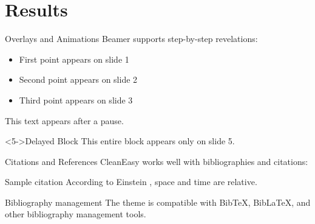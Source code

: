 \section{Results}
\begin{frame}{Overlays and Animations}
  Beamer supports step-by-step revelations:
  
  \begin{itemize}
    \item<1-> First point appears on slide 1
    \item<2-> Second point appears on slide 2
    \item<3-> Third point appears on slide 3
  \end{itemize}
  \pause
  This text appears after a pause.
  
  \begin{block}<5->{Delayed Block}
    This entire block appears only on slide 5.
  \end{block}
\end{frame}

\begin{frame}{Citations and References}
  CleanEasy works well with bibliographies and citations:
  
  \begin{block}{Sample citation}
    According to Einstein \cite{einstein1905}, space and time are relative.
  \end{block}
  
  \begin{exampleblock}{Bibliography management}
    The theme is compatible with BibTeX, BibLaTeX, and other bibliography management tools.
  \end{exampleblock}
  
\end{frame}

